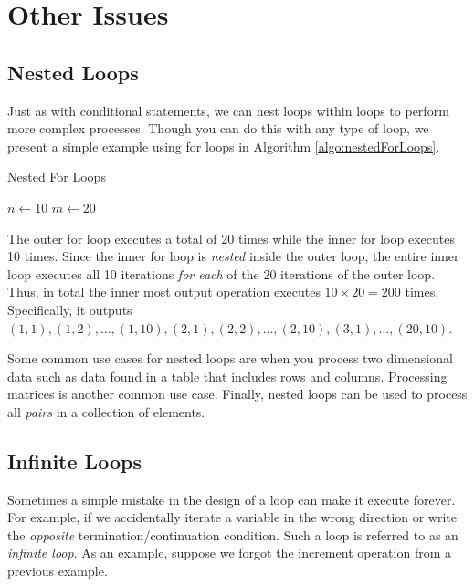 \section{Other Issues}

\subsection{Nested Loops}

Just as with conditional statements, we can nest loops within loops to perform
more complex processes.  Though you can do this with any type of loop, we 
present a simple example using for loops in Algorithm \ref{algo:nestedForLoops}.

\begin{algorithm}[h]
\caption{Nested For Loops}
\label{algo:nestedForLoops}
$n \leftarrow 10$ \;
$m \leftarrow 20$ \;
\end{algorithm}

The outer for loop executes a total of 20 times while the inner for loop 
executes 10 times.  Since the inner for loop is \emph{nested} inside the 
outer loop, the entire inner loop executes all 10 iterations \emph{for each}
of the 20 iterations of the outer loop.  Thus, in total the inner most output
operation executes $10 \times 20 = 200$ times.  Specifically, it outputs 
$(1, 1), (1, 2), \ldots, (1, 10), (2, 1), (2, 2), \ldots, (2, 10), (3, 1), \ldots, (20, 10)$.

Some common  use cases for nested loops are when you process two dimensional data
such as data found in a table that includes rows and columns.  Processing matrices
is another common use case.  Finally, nested loops can be used to process all \emph{pairs}
in a collection of elements.

\subsection{Infinite Loops}
\label{subsection:infiniteLoops}

Sometimes a simple mistake in the design of a loop can make it execute forever.  
For example, if we accidentally iterate a variable in the wrong direction or write the
\emph{opposite} termination/continuation condition.  Such a loop is referred to as 
an \emph{infinite loop}.  As an example, suppose we forgot the increment operation
from a previous example.

